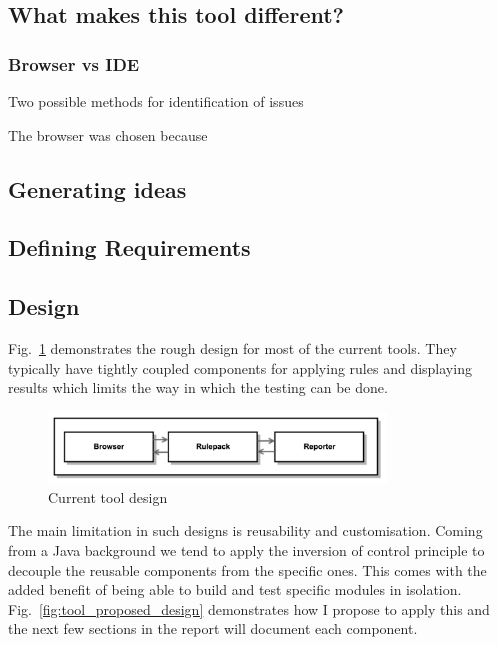 \subsection{What makes this tool different?}


\subsubsection{Browser vs IDE}
Two possible methods for identification of issues

The browser was chosen because


\subsection{Generating ideas}

\subsection{Defining Requirements}

\subsection{Design}
Fig.~\ref{fig:tool_current_design} demonstrates the rough design for most of
the current tools. They typically have tightly coupled components for
applying rules and displaying results which limits the way in which the
testing can be done.

\begin{figure}[H]
\centering
\includegraphics[width=0.8\textwidth]{figures/a11y_tool_current_design}
\captionsetup{justification=centering}
\caption{Current tool design
\label{fig:tool_current_design}}
\end{figure}

The main limitation in such designs is reusability and customisation. Coming
from a Java background we tend to apply the inversion of control principle to
decouple the reusable components from the specific ones. This comes with the
added benefit of being able to build and test specific modules in isolation.
Fig.~\ref{fig:tool_proposed_design} demonstrates how I propose to apply
this and the next few sections in the report will document each component.

